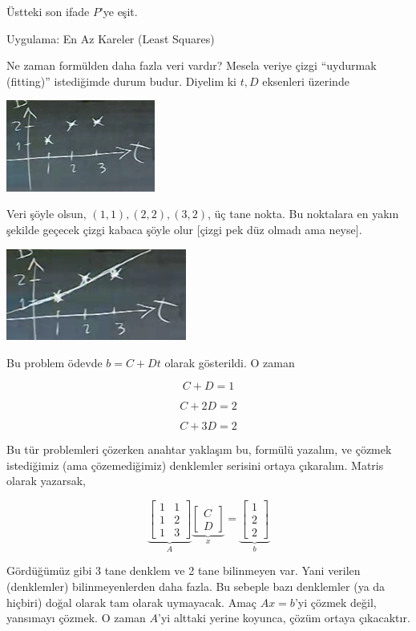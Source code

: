 \documentclass[12pt,fleqn]{article}\usepackage{../../common}
\begin{document}
Üstteki son ifade $P$'ye eşit. 

Uygulama: En Az Kareler (Least Squares)

Ne zaman formülden daha fazla veri vardır? Mesela veriye çizgi ``uydurmak
(fitting)'' istediğimde durum budur. Diyelim ki $t,D$ eksenleri üzerinde

\includegraphics[height=3cm]{15_6.png}

Veri şöyle olsun, $(1,1),(2,2),(3,2)$, üç tane nokta. Bu noktalara en yakın
şekilde geçecek çizgi kabaca şöyle olur [çizgi pek düz olmadı ama neyse].

\includegraphics[height=3cm]{15_7.png}

Bu problem ödevde $b = C+Dt$ olarak gösterildi. O zaman 

$$ C + D = 1 $$

$$ C + 2D = 2 $$

$$ C + 3D = 2 $$

Bu tür problemleri çözerken anahtar yaklaşım bu, formülü yazalım, ve çözmek
istediğimiz (ama çözemediğimiz) denklemler serisini ortaya
çıkaralım. Matris olarak yazarsak, 

$$ 
\underbrace{
\left[\begin{array}{rr}
1 & 1 \\
1 & 2 \\
1 & 3 
\end{array}\right]
}_{A}
\underbrace{
\left[\begin{array}{r}
C  \\
D  
\end{array}\right]
}_{x}
=
\underbrace{
\left[\begin{array}{r}
1 \\
2 \\
2  
\end{array}\right]
}_{b}
 $$

Gördüğümüz gibi 3 tane denklem ve 2 tane bilinmeyen var. Yani verilen
(denklemler) bilinmeyenlerden daha fazla. Bu sebeple bazı denklemler (ya da
hiçbiri) doğal olarak tam olarak uymayacak. Amaç $Ax = b$'yi çözmek değil,
yansımayı çözmek. O zaman $A$'yi alttaki yerine koyunca, çözüm ortaya
çıkacaktır. 
\end{document}
